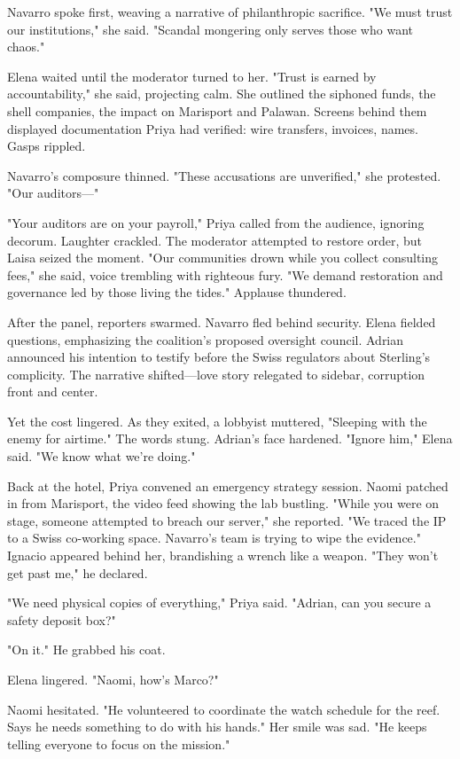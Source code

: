 Navarro spoke first, weaving a narrative of philanthropic sacrifice. "We must trust our institutions," she said. "Scandal mongering only serves those who want chaos."

Elena waited until the moderator turned to her. "Trust is earned by accountability," she said, projecting calm. She outlined the siphoned funds, the shell companies, the impact on Marisport and Palawan. Screens behind them displayed documentation Priya had verified: wire transfers, invoices, names. Gasps rippled.

Navarro's composure thinned. "These accusations are unverified," she protested. "Our auditors—"

"Your auditors are on your payroll," Priya called from the audience, ignoring decorum. Laughter crackled. The moderator attempted to restore order, but Laisa seized the moment. "Our communities drown while you collect consulting fees," she said, voice trembling with righteous fury. "We demand restoration and governance led by those living the tides." Applause thundered.

After the panel, reporters swarmed. Navarro fled behind security. Elena fielded questions, emphasizing the coalition's proposed oversight council. Adrian announced his intention to testify before the Swiss regulators about Sterling's complicity. The narrative shifted—love story relegated to sidebar, corruption front and center.

Yet the cost lingered. As they exited, a lobbyist muttered, "Sleeping with the enemy for airtime." The words stung. Adrian's face hardened. "Ignore him," Elena said. "We know what we're doing."

Back at the hotel, Priya convened an emergency strategy session. Naomi patched in from Marisport, the video feed showing the lab bustling. "While you were on stage, someone attempted to breach our server," she reported. "We traced the IP to a Swiss co-working space. Navarro's team is trying to wipe the evidence." Ignacio appeared behind her, brandishing a wrench like a weapon. "They won't get past me," he declared.

"We need physical copies of everything," Priya said. "Adrian, can you secure a safety deposit box?"

"On it." He grabbed his coat.

Elena lingered. "Naomi, how's Marco?"

Naomi hesitated. "He volunteered to coordinate the watch schedule for the reef. Says he needs something to do with his hands." Her smile was sad. "He keeps telling everyone to focus on the mission."

